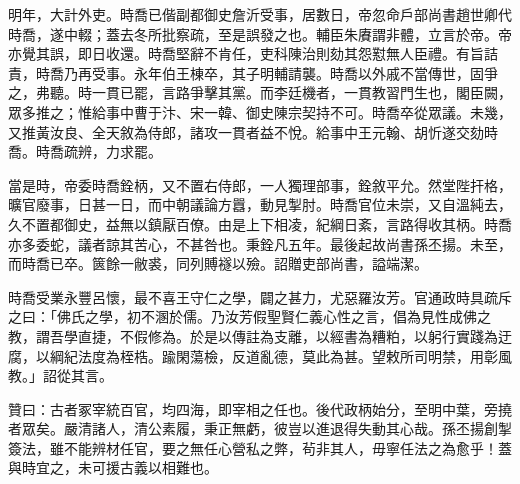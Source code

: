\begin{pinyinscope}
明年，大計外吏。時喬已偕副都御史詹沂受事，居數日，帝忽命戶部尚書趙世卿代時喬，遂中輟；蓋去冬所批察疏，至是誤發之也。輔臣朱賡謂非體，立言於帝。帝亦覺其誤，即日收還。時喬堅辭不肯任，吏科陳治則劾其怨懟無人臣禮。有旨詰責，時喬乃再受事。永年伯王棟卒，其子明輔請襲。時喬以外戚不當傳世，固爭之，弗聽。時一貫已罷，言路爭擊其黨。而李廷機者，一貫教習門生也，閣臣闕，眾多推之；惟給事中曹于汴、宋一韓、御史陳宗契持不可。時喬卒從眾議。未幾，又推黃汝良、全天敘為侍郎，諸攻一貫者益不悅。給事中王元翰、胡忻遂交劾時喬。時喬疏辨，力求罷。

當是時，帝委時喬銓柄，又不置右侍郎，一人獨理部事，銓敘平允。然堂陛扞格，曠官廢事，日甚一日，而中朝議論方囂，動見掣肘。時喬官位未崇，又自溫純去，久不置都御史，益無以鎮厭百僚。由是上下相凌，紀綱日紊，言路得收其柄。時喬亦多委蛇，議者諒其苦心，不甚咎也。秉銓凡五年。最後起故尚書孫丕揚。未至，而時喬已卒。篋餘一敝裘，同列賻襚以殮。詔贈吏部尚書，謚端潔。

時喬受業永豐呂懷，最不喜王守仁之學，闢之甚力，尤惡羅汝芳。官通政時具疏斥之曰：「佛氏之學，初不溷於儒。乃汝芳假聖賢仁義心性之言，倡為見性成佛之教，謂吾學直捷，不假修為。於是以傳註為支離，以經書為糟粕，以躬行實踐為迂腐，以綱紀法度為桎梏。踰閑蕩檢，反道亂德，莫此為甚。望敕所司明禁，用彰風教。」詔從其言。

贊曰：古者冢宰統百官，均四海，即宰相之任也。後代政柄始分，至明中葉，旁撓者眾矣。嚴清諸人，清公素履，秉正無虧，彼豈以進退得失動其心哉。孫丕揚創掣簽法，雖不能辨材任官，要之無任心營私之弊，茍非其人，毋寧任法之為愈乎！蓋與時宜之，未可援古義以相難也。


\end{pinyinscope}